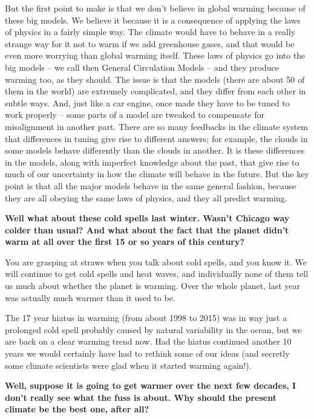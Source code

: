 \documentclass[11pt]{article}
\begin{document}
But the first point to make is that we don't believe in global warming
because of these big models. We believe it because it is a consequence
of applying the laws of physics in a fairly simple way. The climate
would have to behave in a really strange way for it not to warm if we
add greenhouse gases, and that would be even more worrying than global
warming itself. These laws of physics go into the big models -- we call
then General Circulation Models -- and they produce warming too, as they
should. The issue is that the models (there are about 50 of them in the
world) are extremely complicated, and they differ from each other in
subtle ways. And, just like a car engine, once made they have to be
tuned to work properly -- some parts of a model are tweaked to
compensate for misalignment in another part. There are so many feedbacks
in the climate system that differences in tuning give rise to different
answers; for example, the clouds in some models behave differently than
the clouds in another. It is these differences in the models, along with
imperfect knowledge about the past, that give rise to much of our
uncertainty in how the climate will behave in the future. But the key
point is that all the major models behave in the same general fashion,
because they are all obeying the same laws of physics, and they all
predict warming.

\textbf{\color{navy} Well what about these cold spells last winter. Wasn't Chicago
way colder than usual? And what about the fact that the planet didn't
warm at all over the first 15 or so years of this century?}

You are grasping at straws when you talk about cold spells, and you know
it. We will continue to get cold spells and heat waves, and individually
none of them tell us much about whether the planet is warming. Over the
whole planet, last year was actually much warmer than it used to be.

The 17 year hiatus in warming (from about 1998 to 2015) was in way just
a prolonged cold spell probably caused by natural variability in the
ocean, but we are back on a clear warming trend now. Had the hiatus
continued another 10 years we would certainly have had to rethink some
of our ideas (and secretly some climate scientists were glad when it
started warming again!).

\textbf{\color{navy} Well, suppose it is going to get warmer over the next few
decades, I don't really see what the fuss is about. Why should the
present climate be the best one, after all?}
\end{document}
